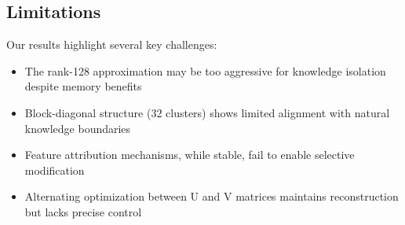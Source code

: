 \documentclass{article} %
\begin{document}
\subsection{Limitations}
Our results highlight several key challenges:
\begin{itemize}
    \item The rank-128 approximation may be too aggressive for knowledge isolation despite memory benefits
    \item Block-diagonal structure (32 clusters) shows limited alignment with natural knowledge boundaries
    \item Feature attribution mechanisms, while stable, fail to enable selective modification
    \item Alternating optimization between U and V matrices maintains reconstruction but lacks precise control
\end{itemize}
\end{document}
